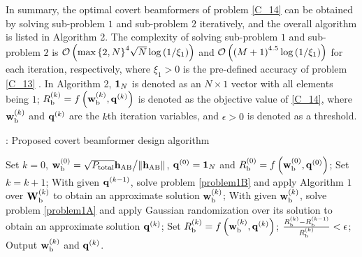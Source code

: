 \documentclass[10pt,journal,letterpaper,twocolumn,twoside]{IEEEtran} %
\begin{document}
In summary, the optimal covert beamformers of   problem \eqref{C_14}  can be obtained by
  solving   sub-problem $1$ and sub-problem $2$ iteratively, and the overall algorithm  is listed in Algorithm 2.
The complexity of solving sub-problem $1$ and sub-problem $2$ is ${\cal O}\left( {\max {{\left\{ {2,N} \right\}}^4}\sqrt {N} \log \left( {{1 \mathord{\left/
 {\vphantom {1 {{\xi _1}}}} \right.
 \kern-\nulldelimiterspace} {{\xi _1}}}} \right)} \right)$ and ${\cal O}\left( {{{\left( {M+1}  \right)}^{4.5}}\log \left( {{1 \mathord{\left/
 {\vphantom {1 {{\xi _1}}}} \right.
 \kern-\nulldelimiterspace} {{\xi _1}}}}  \right)} \right)$ for each iteration, respectively, where ${\xi _1} > 0$ is the pre-defined accuracy of problem \eqref{C_13} \cite{ZLuo10Semidefinite,Grant09cvx}.
  In Algorithm 2, ${{\bf{1}}_N}$ is denoted as an $N \times 1$ vector with all elements being $1$; $R_{\rm{b}}^{\left( k \right)} = f\left( {{\bf{w}}_{\rm{b}}^{\left( k \right)},{{\bf{q}}^{\left( k \right)}}} \right)$ is denoted as the objective value of \eqref{C_14}, where
${{\bf{w}}_{\rm{b}}^{\left( k \right)}}$ and ${{\bf{q}}^{\left( {k } \right)}}$  are the $k$th iteration variables, and $\epsilon > 0$ is denoted as a threshold.

\begin{algorithm}[htb]
  \caption{: Proposed covert beamformer design algorithm}
  \begin{algorithmic}[1]
     Set $k = 0$, ${\bf{w}}_{\rm{b}}^{\left( 0 \right)} = {{\sqrt {{P_{{\rm{total}}}}} {{\bf{h}}_{{\rm{AB}}}}} \mathord{\left/
 {\vphantom {{\sqrt {{P_{{\rm{total}}}}} {{\bf{h}}_{{\rm{AB}}}}} {\left\| {{{\bf{h}}_{{\rm{AB}}}}} \right\|}}} \right.
 \kern-\nulldelimiterspace} {\left\| {{{\bf{h}}_{{\rm{AB}}}}} \right\|}}$, ${{\bf{q}}^{\left( 0 \right)}} = {{\bf{1}}_N}$ and $R_{\rm{b}}^{\left( 0 \right)} = f\left( {{\bf{w}}_{\rm{b}}^{\left( 0 \right)},{{\bf{q}}^{\left( 0 \right)}}} \right)$;
     \State Set $k = k + 1$;
    \State  With given ${{\bf{q}}^{\left( {k - 1} \right)}}$, solve problem \eqref{problem1B}  and apply Algorithm $1$ over ${{\bf{W}}_{\rm{b}}^{\left( k \right)}}$ to obtain an approximate solution ${{\bf{w}}_{\rm{b}}^{\left( k \right)}}$;
    \State With given ${{\bf{w}}_{\rm{b}}^{\left( k \right)}}$, solve problem \eqref{problem1A}  and apply
Gaussian randomization over its solution to obtain an approximate solution ${{\bf{q}}^{\left( {k } \right)}}$;
   \State  Set $R_{\rm{b}}^{\left( k \right)} = f\left( {{\bf{w}}_{\rm{b}}^{\left( k \right)},{{\bf{q}}^{\left( k \right)}}} \right)$;
     $\frac{{R_{\rm{b}}^{\left( k \right)} - R_{\rm{b}}^{\left( {k - 1} \right)}}}{{R_{\rm{b}}^{\left( k \right)}}} < \epsilon  $;
    \State     Output ${{\bf{w}}_{\rm{b}}^{\left( k \right)}}$ and  ${{\bf{q}}^{\left( {k } \right)}}$.
  \end{algorithmic}
\end{algorithm}
\end{document}
